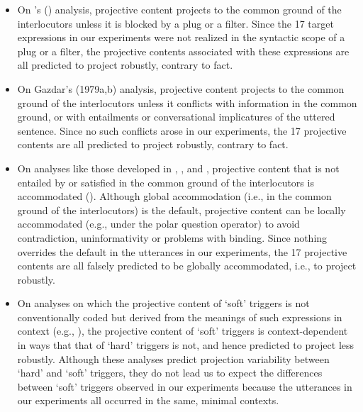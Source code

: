 \documentclass[11pt,fleqn]{article}
\newcommand{\6}{\mbox{$[\hspace*{-.6mm}[$}}
\newcommand{\9}{\mbox{$]\hspace*{-.6mm}]$}}
\newcommand{\citetpos}[1]{\citeauthor{#1}'s (\citeyear{#1})}
\begin{document}
\begin{itemize}[topsep=0pt,itemsep=-1pt]

\item On \citetpos{karttunen73} analysis, projective content projects to the common ground of the interlocutors unless it is blocked by a plug or a filter. Since the 17 target expressions in our experiments were not realized in the syntactic scope of a plug or a filter, the projective contents associated with these expressions are all predicted to project robustly, contrary to fact.

\item On Gazdar's (1979a,b)\nocite{gazdar79a,gazdar79b} analysis, projective content projects to the common ground of the interlocutors unless it conflicts with information in the common ground, or with entailments or conversational implicatures of the uttered sentence. Since no such conflicts arose in our experiments, the 17 projective contents are all predicted to project robustly, contrary to fact.

\item On analyses like those developed in \citealt{heim83}, \citealt{vds92}, \citealt{beaver-krahmer2001} and \citealt{vds-geurts01}, projective content that is not entailed by or satisfied in the common ground of the interlocutors is accommodated (\citealt{lewis79}). Although global accommodation (i.e., in the common ground of the interlocutors) is the default, projective content can be locally accommodated (e.g., under the polar question operator) to avoid contradiction, uninformativity or problems with binding. Since nothing overrides the default in the utterances in our experiments, the 17 projective contents are all falsely predicted to be globally accommodated, i.e., to project robustly.

\item On analyses on which the projective content of `soft' triggers is not conventionally coded but derived from the meanings of such expressions in context (e.g., \citealt{simons01,abusch02,abusch10,abbott06,chemla09b,romoli2015}), the projective content of `soft' triggers is context-dependent in ways that that of `hard' triggers is not, and hence predicted to project less robustly. Although these analyses predict projection variability between `hard' and `soft' triggers, they do not lead us to expect the differences between `soft' triggers observed in our experiments because the utterances in our experiments all occurred in the same, minimal contexts.

\end{itemize}
\end{document}
